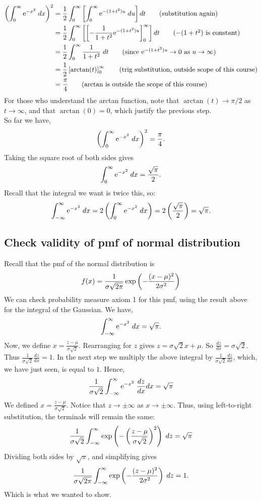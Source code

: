 \begin{align*}
\brac{\int_0^\infty \e^{-x^2} \; dx}^2 & = \frac{1}{2}\int_0^\infty \squac{ \int_0^\infty \e^{-(1 + t^2)u} \; du} dt \tag{substitution again} \\
	& = \frac{1}{2}\int_0^\infty \squac{ \squac{-\frac{1}{1+t^2} \e^{-(1 + t^2)u}}_0^\infty } dt \tag{$-(1+t^2)$ is constant} \\
	& =  \frac{1}{2}\int_0^\infty \frac{1}{1+t^2} \; dt \tag{since $\e^{-(1+t^2)u} \rightarrow 0$ as $u \rightarrow \infty$} \\
	& = \frac{1}{2}\squac{\arctan(t)}_0^\infty \tag{trig substitution, outside scope of this course} \\
	& = \frac{\pi}{4} \tag{$\arctan$ is outside the scope of this course}
\end{align*}
For those who understand the arctan function, note that $\arctan(t) \rightarrow \pi/2$ as $t \rightarrow \infty$, and that $\arctan(0) = 0$, which justify the previous step. \\

\noindent So far we have,
\[
\left(\int_0^\infty \mathrm{e}^{-x^2} \; dx\right)^2 = \frac{\pi}{4}.
\]
Taking the square root of both sides gives
\[
\int_0^\infty \mathrm{e}^{-x^2} \; dx = \frac{\sqrt{\pi}}{2}.
\]
Recall that the integral we want is twice this, so:
\[
\int_{-\infty}^\infty \mathrm{e}^{-x^2} \; dx = 2\left(\int_0^\infty \mathrm{e}^{-x^2} \; dx\right) = 2\left( \frac{\sqrt{\pi}}{2}\right) =  \sqrt{\pi}.
\]

\subsection{Check validity of pmf of normal distribution} \label{check normal distribution}
Recall that the pmf of the normal distribution is
\[
f(x) = \frac{1}{\sigma \sqrt{2\pi}} \exp\left(-\frac{(x-\mu)^2}{2\sigma^2}\right)
\]
We can check probability measure axiom 1 for this pmf, using the result above for the integral of the Gaussian. We have,
\[
\int_{-\infty}^\infty \mathrm{e}^{-x^2} \; dx = \sqrt{\pi}.
\]
Now, we define $x = \frac{z-\mu}{\sigma\sqrt{2}}$. Rearranging for $z$ gives $z = \sigma\sqrt{2} x + \mu$. So $\frac{dz}{dx} = \sigma\sqrt{2}$. Thus $\frac{1}{\sigma\sqrt{2}}\frac{dz}{dx} = 1$. In the next step we multiply the above integral by $\frac{1}{\sigma\sqrt{2}}\frac{dz}{dx}$, which, we have just seen, is equal to $1$. Hence,
\[
\frac{1}{\sigma\sqrt{2}} \int_{-\infty}^\infty \mathrm{e}^{-x^2} \; \frac{dz}{dx} dx = \sqrt{\pi}
\]
We defined $x = \frac{z-\mu}{\sigma\sqrt{2}}$. Notice that $z \rightarrow \pm\infty$ as $x \rightarrow \pm\infty$. Thus, using left-to-right substitution, the terminals will remain the same:
\[
\frac{1}{\sigma\sqrt{2}} \int_{-\infty}^\infty \exp\left(-\left(\frac{z-\mu}{\sigma\sqrt{2}}\right)^2\right) \; dz = \sqrt{\pi}
\]
Dividing both sides by $\sqrt{\pi}$, and simplifying gives
\[
\frac{1}{\sigma\sqrt{2\pi}} \int_{-\infty}^\infty \exp\left(-\frac{(z-\mu)^2}{2\sigma^2}\right) \; dz = 1.
\]
Which is what we wanted to show.

